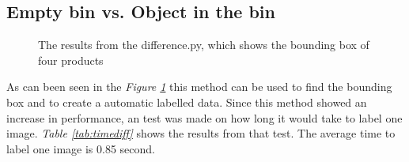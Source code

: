 \clearpage
\subsection{Empty bin vs. Object in the bin} \label{subsec:emptybin}
\begin{figure}[h]
    \centering
    \hfill
    \hfill
    \hfill
    \caption{The results from the difference.py, which shows the bounding box of four products}
    \label{figure: labelling}
\end{figure}
As can been seen in the \textit{Figure \ref{figure: labelling}} this method can be used to find the bounding box and to create a automatic labelled data.  
Since this method showed an increase in performance, an test was made on how long it would take to label one image. 
\textit{Table \ref{tab:timediff}} shows the results from that test. The average time to label one image is 0.85 second.



